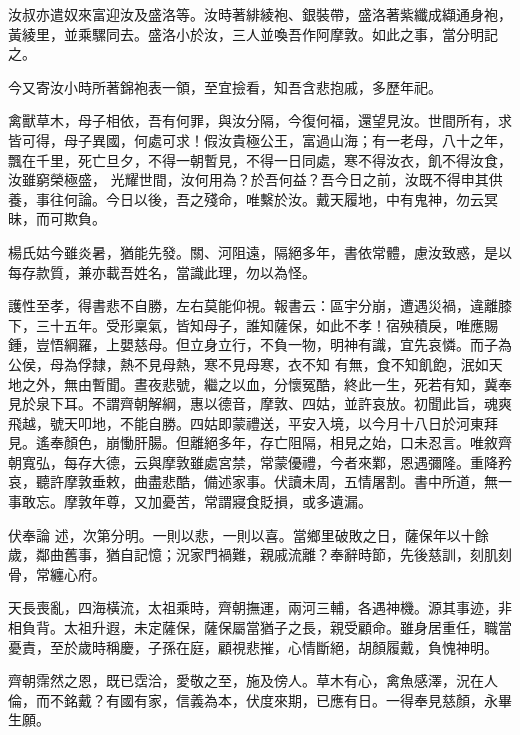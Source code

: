 \begin{pinyinscope}
 汝叔亦遣奴來富迎汝及盛洛等。汝時著緋綾袍、銀裝帶，盛洛著紫纖成纈通身袍，黃綾里，並乘騾同去。盛洛小於汝，三人並喚吾作阿摩敦。如此之事，當分明記之。



 今又寄汝小時所著錦袍表一領，至宜撿看，知吾含悲抱戚，多歷年祀。



 禽獸草木，母子相依，吾有何罪，與汝分隔，今復何福，還望見汝。世間所有，求皆可得，母子異國，何處可求！假汝貴極公王，富過山海；有一老母，八十之年，飄在千里，死亡旦夕，不得一朝暫見，不得一日同處，寒不得汝衣，飢不得汝食，汝雖窮榮極盛，
 光耀世間，汝何用為？於吾何益？吾今日之前，汝既不得申其供養，事往何論。今日以後，吾之殘命，唯繫於汝。戴天履地，中有鬼神，勿云冥昧，而可欺負。



 楊氏姑今雖炎暑，猶能先發。關、河阻遠，隔絕多年，書依常體，慮汝致惑，是以每存款質，兼亦載吾姓名，當識此理，勿以為怪。



 護性至孝，得書悲不自勝，左右莫能仰視。報書云：區宇分崩，遭遇災禍，違離膝下，三十五年。受形稟氣，皆知母子，誰知薩保，如此不孝！宿殃積戾，唯應賜鍾，豈悟綱羅，上嬰慈母。但立身立行，不負一物，明神有識，宜先哀憐。而子為公侯，母為俘隸，熱不見母熱，寒不見母寒，衣不知
 有無，食不知飢飽，泯如天地之外，無由暫聞。晝夜悲號，繼之以血，分懷冤酷，終此一生，死若有知，冀奉見於泉下耳。不謂齊朝解綱，惠以德音，摩敦、四姑，並許哀放。初聞此旨，魂爽飛越，號天叩地，不能自勝。四姑即蒙禮送，平安入境，以今月十八日於河東拜見。遙奉顏色，崩慟肝腸。但離絕多年，存亡阻隔，相見之始，口未忍言。唯敘齊朝寬弘，每存大德，云與摩敦雖處宮禁，常蒙優禮，今者來鄴，恩遇彌隆。重降矜哀，聽許摩敦垂敕，曲盡悲酷，備述家事。伏讀未周，五情屠割。書中所道，無一事敢忘。摩敦年尊，又加憂苦，常謂寢食貶損，或多遺漏。



 伏奉論
 述，次第分明。一則以悲，一則以喜。當鄉里破敗之日，薩保年以十餘歲，鄰曲舊事，猶自記憶；況家門禍難，親戚流離？奉辭時節，先後慈訓，刻肌刻骨，常纏心府。



 天長喪亂，四海橫流，太祖乘時，齊朝撫運，兩河三輔，各遇神機。源其事迹，非相負背。太祖升遐，未定薩保，薩保屬當猶子之長，親受顧命。雖身居重任，職當憂責，至於歲時稱慶，子孫在庭，顧視悲摧，心情斷絕，胡顏履戴，負愧神明。



 齊朝霈然之恩，既已霑洽，愛敬之至，施及傍人。草木有心，禽魚感澤，況在人倫，而不銘戴？有國有家，信義為本，伏度來期，已應有日。一得奉見慈顏，永畢生願。




\end{pinyinscope}
